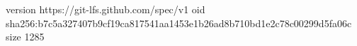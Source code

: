 version https://git-lfs.github.com/spec/v1
oid sha256:b7c5a327407b9cf19ca817541aa1453e1b26ad8b710bd1e2c78c00299d5fa06c
size 1285
